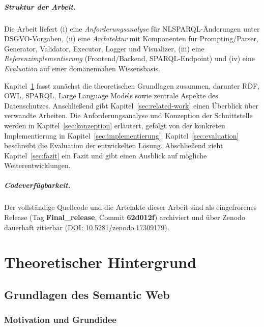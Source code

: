 \paragraph{Struktur der Arbeit.}
Die Arbeit liefert (i) eine \emph{Anforderungsanalyse} für NL{\textrightarrow}SPARQL-Änderungen unter DSGVO-Vorgaben,  
(ii) eine \emph{Architektur} mit Komponenten für Prompting/Parser, Generator, Validator, Executor, Logger und Visualizer,  
(iii) eine \emph{Referenzimplementierung} (Frontend/Backend, SPARQL-Endpoint)  
und (iv) eine \emph{Evaluation} auf einer domänennahen Wissensbasis.

Kapitel~\ref{sec:theorie} fasst zunächst die theoretischen Grundlagen zusammen, darunter RDF, OWL, SPARQL, Large Language Models sowie zentrale Aspekte des Datenschutzes. Anschließend gibt Kapitel~\ref{sec:related-work} einen Überblick über verwandte Arbeiten. Die Anforderungsanalyse und Konzeption der Schnittstelle werden in Kapitel~\ref{sec:konzeption} erläutert, gefolgt von der konkreten Implementierung in Kapitel~\ref{sec:implementierung}. Kapitel~\ref{sec:evaluation} beschreibt die Evaluation der entwickelten Lösung. Abschließend zieht Kapitel~\ref{sec:fazit} ein Fazit und gibt einen Ausblick auf mögliche Weiterentwicklungen.

\paragraph{Codeverfügbarkeit.}
Der vollständige Quellcode und die Artefakte dieser Arbeit sind als eingefrorenes Release
(Tag \textbf{Final\_release}, Commit \textbf{62d012f}) archiviert und über Zenodo dauerhaft
zitierbar (\href{https://doi.org/10.5281/zenodo.17309179}{DOI: 10.5281/zenodo.17309179}).









\chapter{Theoretischer Hintergrund}
\label{sec:theorie}

\section{Grundlagen des Semantic Web}
\label{sec:grundlagen-semantic-web}

\subsection{Motivation und Grundidee}

